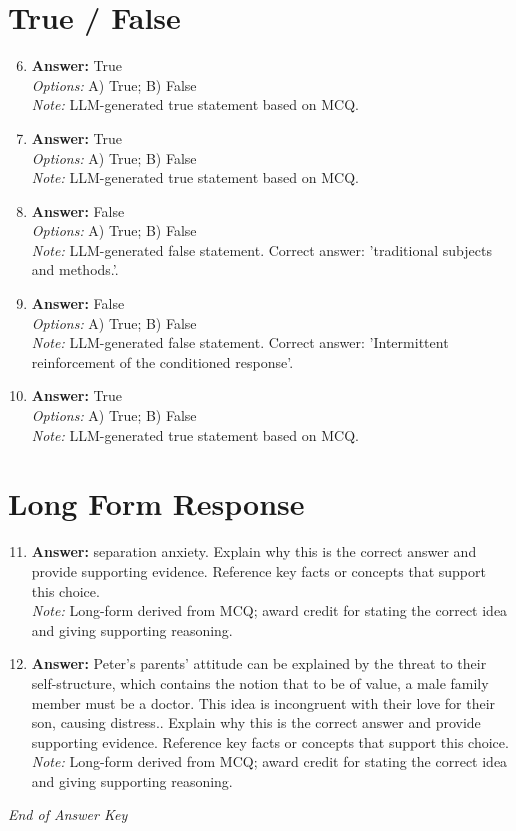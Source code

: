 \documentclass[12pt]{article}
\begin{document}
\section*{True / False}
\begin{enumerate}[label=\arabic*.]
\setcounter{enumi}{5}
\item \textbf{Answer:} True
\\ \textit{Options:} A) True; B) False
\\ \textit{Note:} LLM-generated true statement based on MCQ.
\item \textbf{Answer:} True
\\ \textit{Options:} A) True; B) False
\\ \textit{Note:} LLM-generated true statement based on MCQ.
\item \textbf{Answer:} False
\\ \textit{Options:} A) True; B) False
\\ \textit{Note:} LLM-generated false statement. Correct answer: 'traditional subjects and methods.'.
\item \textbf{Answer:} False
\\ \textit{Options:} A) True; B) False
\\ \textit{Note:} LLM-generated false statement. Correct answer: 'Intermittent reinforcement of the conditioned response'.
\item \textbf{Answer:} True
\\ \textit{Options:} A) True; B) False
\\ \textit{Note:} LLM-generated true statement based on MCQ.
\end{enumerate}

\section*{Long Form Response}
\begin{enumerate}[label=\arabic*.]
\setcounter{enumi}{10}
\item \textbf{Answer:} separation anxiety. Explain why this is the correct answer and provide supporting evidence. Reference key facts or concepts that support this choice.
\\ \textit{Note:} Long-form derived from MCQ; award credit for stating the correct idea and giving supporting reasoning.
\item \textbf{Answer:} Peter's parents' attitude can be explained by the threat to their self-structure, which contains the notion that to be of value, a male family member must be a doctor. This idea is incongruent with their love for their son, causing distress.. Explain why this is the correct answer and provide supporting evidence. Reference key facts or concepts that support this choice.
\\ \textit{Note:} Long-form derived from MCQ; award credit for stating the correct idea and giving supporting reasoning.
\end{enumerate}

\vfill
\noindent\textit{End of Answer Key}
\end{document}
